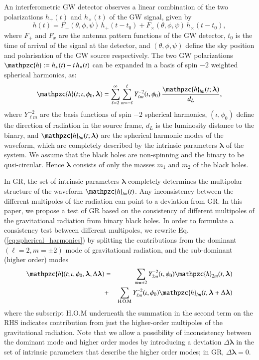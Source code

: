 \documentclass[prl,preprintnumbers,twocolumn,eqsecnum,floatfix,a4paper,nofootinbib,superscriptaddress]{revtex4}
\newcommand{\h}{\mathpzc{h}}
\newcommand{\Ylm}{{Y}^{-2}_{\ell m}}
\newcommand{\blambda}{\bm{\lambda}}
\begin{document}

An interferometric GW detector observes a linear combination of the two polarizations $h_+(t)$ and $h_\times(t)$ of the GW signal, given by 
\begin{equation}
h(t) = F_+(\theta, \phi, \psi) \, h_+(t-t_0) + F_{\times}(\theta, \phi, \psi)\, {h}_{\times}(t-t_0), 
\label{eq:det_response}
\end{equation}
where $F_+$ and $F_x$ are the antenna pattern functions of the GW detector, $t_0$ is the time of arrival of the signal at the detector, and $(\theta, \phi, \psi)$ define the sky position and polarisation of the GW source respectively. The two GW polarizations $\h := h_+(t) - i \, h_\times(t)$ can be expanded in a basis of spin $-2$ weighted spherical harmonics, as:
\begin{equation}
\h(t; \iota, \phi_0, \blambda) = \sum _{\ell=2}^{\infty} \sum _{m=-\ell}^{\ell} \Ylm (\iota, \phi_0) \, \frac{{\h}_{lm}(t; \blambda)}{d_L}, 
\label{eq:spherical_harmonics}
\end{equation}
where $\Ylm$ are the basis functions of spin $-2$ spherical harmonics, $(\iota, \phi_0)$ define the direction of radiation in the source frame, $d_L$ is  the luminosity distance to the binary, and ${\h}_{lm}(t; \blambda)$ are the spherical harmonic modes of the waveform, which are completely described by the intrinsic parameters $\blambda$ of the system. We assume that the black holes are non-spinning and the binary to be qusi-circular. Hence $\blambda$ consists of only the masses $m_1$ and $m_2$ of the black holes. 

In GR, the set of intrinsic parameters $\blambda$ completely determines the multipolar structure of the waveform ${\h}_{lm}(t)$. Any inconsistency between the different multipoles of the radiation can point to a deviation from GR. In this paper, we propose a test of GR based on the consistency of different multipoles of the gravitational radiation from binary black holes. In order to formulate a consistency test between different multipoles, we rewrite Eq.(\ref{eq:spherical_harmonics}) by splitting the contributions from the dominant $(\ell = 2, m = \pm 2)$ mode of gravitational radiation, and the sub-dominant (higher order) modes 
\begin{eqnarray}
\h(t; \iota, \phi_0, \blambda, \Delta \blambda) & = & \sum_{m = \pm2} Y^{-2}_{2m} (\iota, \phi_0) {\h}_{2m}(t, \blambda)  \nonumber \\ 
 & + & \sum _{\text{H.O.M}} \Ylm (\iota, \phi_0) \h_{lm}(t, \blambda+\Delta \blambda)
\label{eq:test_HM}
\end{eqnarray}
where the subscript H.O.M underneath the summation in the second term on the RHS indicates contribution from just the higher-order multipoles of the gravitational radiation. Note that we allow a possibility of inconsistency between the dominant mode and higher order modes by introducing a deviation $\Delta \blambda$ in the set of intrinsic parameters that describe the higher order modes; in GR,  $\Delta \blambda = 0$. 
\end{document}
